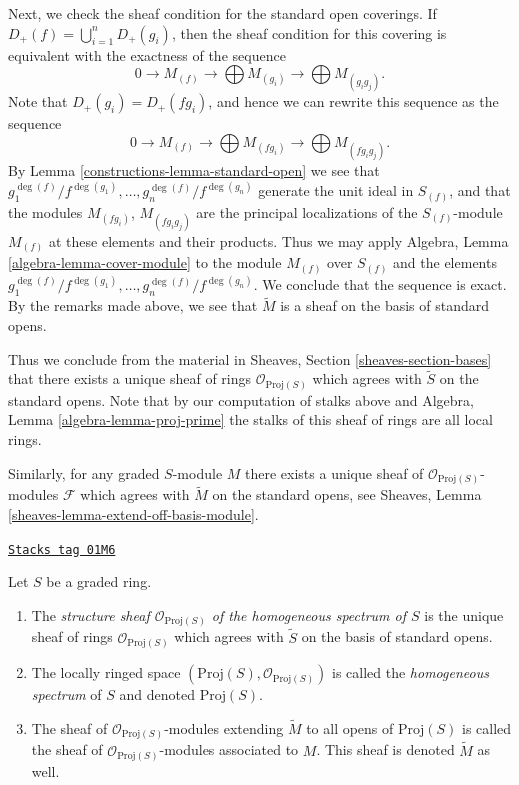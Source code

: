 \medskip\noindent
Next, we check the sheaf condition for the standard open coverings.
If $D_{+}(f) = \bigcup_{i = 1}^n D_{+}(g_i)$, then the sheaf condition
for this covering is equivalent with the exactness of the
sequence
$$
0 \to M_{(f)} \to \bigoplus M_{(g_i)} \to \bigoplus M_{(g_ig_j)}.
$$
Note that $D_{+}(g_i) = D_{+}(fg_i)$, and hence we can rewrite this
sequence as the sequence
$$
0 \to M_{(f)} \to \bigoplus M_{(fg_i)} \to \bigoplus M_{(fg_ig_j)}.
$$
By Lemma \ref{constructions-lemma-standard-open} we see that
$g_1^{\deg(f)}/f^{\deg(g_1)}, \ldots, g_n^{\deg(f)}/f^{\deg(g_n)}$
generate the unit ideal in $S_{(f)}$, and that the modules
$M_{(fg_i)}$, $M_{(fg_ig_j)}$ are the principal localizations
of the $S_{(f)}$-module $M_{(f)}$ at these elements and their products.
Thus we may apply Algebra, Lemma \ref{algebra-lemma-cover-module}
to the module $M_{(f)}$ over $S_{(f)}$ and the elements
$g_1^{\deg(f)}/f^{\deg(g_1)}, \ldots, g_n^{\deg(f)}/f^{\deg(g_n)}$.
We conclude that the sequence is exact. By the remarks
made above, we see that $\widetilde M$ is a sheaf
on the basis of standard opens.

\medskip\noindent
Thus we conclude from the material in
Sheaves, Section \ref{sheaves-section-bases}
that there exists a
unique sheaf of rings $\mathcal{O}_{\text{Proj}(S)}$
which agrees with $\widetilde S$ on the standard opens.
Note that by our computation of stalks above and
Algebra, Lemma \ref{algebra-lemma-proj-prime} the
stalks of this sheaf of rings are all local rings.

\medskip\noindent
Similarly, for any graded $S$-module $M$ there exists
a unique sheaf of $\mathcal{O}_{\text{Proj}(S)}$-modules
$\mathcal{F}$ which agrees with $\widetilde M$ on the
standard opens, see
Sheaves, Lemma \ref{sheaves-lemma-extend-off-basis-module}.

\begin{definition}
\label{constructions-definition-structure-sheaf}
\href{https://stacks.math.columbia.edu/tag/01M6}{\texttt{Stacks tag 01M6}}

Let $S$ be a graded ring.
\begin{enumerate}
\item The {\it structure sheaf $\mathcal{O}_{\text{Proj}(S)}$ of the
homogeneous spectrum of $S$} is the unique sheaf of rings
$\mathcal{O}_{\text{Proj}(S)}$
which agrees with $\widetilde S$ on the basis of standard opens.
\item The locally ringed space
$(\text{Proj}(S), \mathcal{O}_{\text{Proj}(S)})$ is called
the {\it homogeneous spectrum} of $S$ and denoted $\text{Proj}(S)$.
\item The sheaf of $\mathcal{O}_{\text{Proj}(S)}$-modules
extending $\widetilde M$ to all opens of $\text{Proj}(S)$
is called the sheaf of $\mathcal{O}_{\text{Proj}(S)}$-modules
associated to $M$. This sheaf is denoted $\widetilde M$ as
well.
\end{enumerate}
\end{definition}

